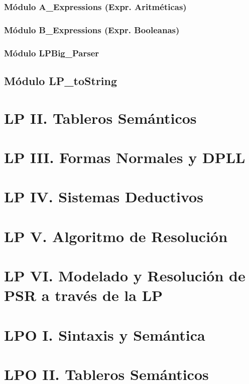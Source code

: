 \documentclass[a4paper]{report}
\begin{document}
\subsection{Módulo A\_Expressions (Expr. Aritméticas)}
\subsection{Módulo B\_Expressions (Expr. Booleanas)}
\subsection{Módulo LPBig\_Parser}

\section{Módulo LP\_toString}



\chapter{LP II. Tableros Semánticos}
\renewcommand{\mtctitle}{}
\mtcskip
\minitoc
\newpage
\chapter{LP III. Formas Normales y DPLL}
\renewcommand{\mtctitle}{}
\mtcskip
\minitoc
\newpage
\chapter{LP IV. Sistemas Deductivos}
\renewcommand{\mtctitle}{}
\mtcskip
\minitoc
\newpage
\chapter{LP V. Algoritmo de Resolución}
\renewcommand{\mtctitle}{}
\mtcskip
\minitoc
\newpage
\chapter{LP VI. Modelado y Resolución de PSR a través de la LP}
\renewcommand{\mtctitle}{}
\mtcskip
\minitoc
\newpage

\chapter{LPO I. Sintaxis y Semántica}
\renewcommand{\mtctitle}{}
\mtcskip
\minitoc
\newpage
\chapter{LPO II. Tableros Semánticos}
\renewcommand{\mtctitle}{}
\mtcskip
\minitoc
\newpage
\end{document}
